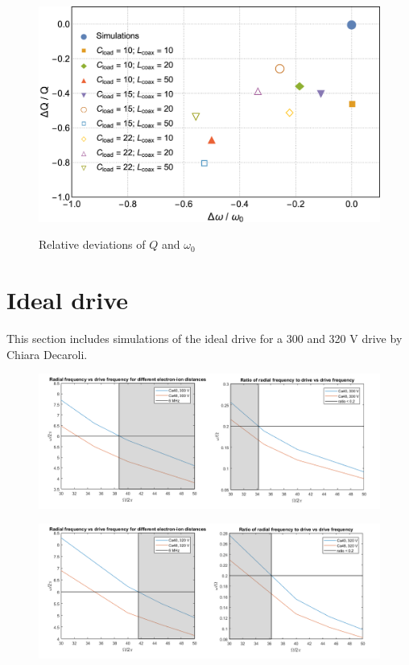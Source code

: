 \begin{figure}[h]
	\centering
	\includegraphics[width=\textwidth]{images/Q_w_plot}
	\label{fig:Q_w_deviation}
	\caption{Relative deviations of $Q$ and $\omega_0$}
\end{figure}

\section{Ideal drive}
This section includes simulations of the ideal drive for a 300 and 320 V drive by Chiara Decaroli.

\begin{figure}[h]
	\centering
	\includegraphics[width=\textwidth]{images/300Vcalcium}
	\label{fig:ideal_drive_300}
	\label{Simulation of the ideal drive for 300V}
\end{figure}
\begin{figure}[h]
	\centering
	\includegraphics[width=\textwidth]{images/320Vcalcium}
	\label{fig:ideal_drive_320}
	\label{Simulation of the ideal drive for 320V}
\end{figure}